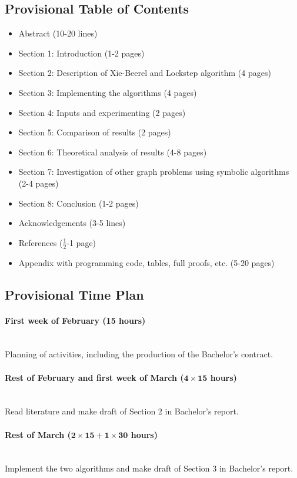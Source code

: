 \documentclass{article}
\newcommand{\timeest}[1]{$\mathbf{#1}$}%
\begin{document}
\subsection*{Provisional Table of Contents}
\begin{itemize}
    \item Abstract (10-20 lines)
    \item Section 1: Introduction (1-2 pages)
    \item Section 2: Description of Xie-Beerel and Lockstep algorithm (4 pages)
    \item Section 3: Implementing the algorithms (4 pages)
    \item Section 4: Inputs and experimenting (2 pages)
    \item Section 5: Comparison of results (2 pages)
    \item Section 6: Theoretical analysis of results (4-8 pages)
    \item Section 7: Investigation of other graph problems using symbolic algorithms (2-4 pages)
    \item Section 8: Conclusion (1-2 pages)
    \item Acknowledgements (3-5 lines)
    \item References ($\frac{1}{2}$-1 page)
    \item Appendix with programming code, tables, full proofs, etc. (5-20 pages)
\end{itemize}

\subsection*{Provisional Time Plan}

\paragraph{First week of February (15 hours)}~\\\noindent
Planning of activities, including the production of the Bachelor's contract.

\paragraph{Rest of February and first week of March (\timeest{4\times 15} hours)}~\\\noindent
Read literature and make draft of Section 2 in Bachelor's report.

\paragraph{Rest of March (\timeest{2\times 15+1\times 30} hours)}~\\\noindent
Implement the two algorithms and make draft of Section 3 in Bachelor's report.
\end{document}
